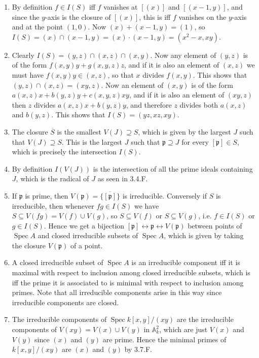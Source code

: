 \documentclass{report}
\newcommand{\closure}[1]{\overline{#1}} %
\newcommand{\p}{\mathfrak{p}}
\newcommand{\A}{\mathbb{A}}
\DeclareMathOperator{\Spec}{Spec}
\begin{document}
\begin{enumerate}[label=\textbf{3.7.\Alph*.}]
	\item By definition $f\in I(S)$ iff $f$ vanishes at $[(x)]$ and $[(x-1,y)]$,
	      and since the $y$-axis is the closure of $[(x)]$, this is iff $f$
	      vanishes on the $y$-axis and at the point $(1,0)$. Now $(x)+(x-1,y)=(1)$,
	      so $I(S)=(x)\cap(x-1,y)=(x)\cdot(x-1,y)=(x^2-x,xy)$.

	\item Clearly $I(S)=(y,z)\cap(x,z)\cap(x,y)$. Now any element of $(y,z)$ is
	      of the form $f(x,y)y+g(x,y,z)z$, and if it is also an element of $(x,z)$
	      we must have $f(x,y)y\in(x,z)$, so that $x$ divides $f(x,y)$. This shows
	      that $(y,z)\cap(x,z)=(xy,z)$. Now an element of $(x,y)$ is of the form
	      $a(x,z)x + b(y,z)y + c(x,y,z)xy$, and if it is also an element of
	      $(xy,z)$ then $z$ divides $a(x,z)x+b(y,z)y$, and therefore $z$ divides
	      both $a(x,z)$ and $b(y,z)$. This shows that $I(S)=(yz,xz,xy)$.

	\item The closure $\closure S$ is the smallest $V(J)\supseteq S$, which is
	      given by the largest $J$ such that $V(J)\supseteq S$. This is the
	      largest $J$ such that $\p\supseteq J$ for every $[\p]\in S$, which is
	      precisely the intersection $I(S)$.

	\item By definition $I(V(J))$ is the intersection of all the prime ideals
	      containing $J$, which is the radical of $J$ as seen in 3.4.F.

	\item If $\p$ is prime, then $V(\p)=\closure{\{[\p]\}}$ is irreducible.
	      Conversely if $S$ is irreducible, then whenever $fg\in I(S)$ we have
	      $S\subseteq V(fg)=V(f)\cup V(g)$, so
	      $S\subseteq V(f)$ or $S\subseteq V(g)$, i.e. $f\in I(S)$ or $g\in I(S)$.
	      Hence we get a bijection $[\p]\leftrightarrow\p\leftrightarrow V(\p)$
	      between points of $\Spec A$ and closed irreducible subsets of $\Spec A$,
	      which is given by taking the closure $V(\p)$ of a point.

	\item A closed irreducible subset of $\Spec A$ is an irreducible component
	      iff it is maximal with respect to inclusion among closed irreducible
	      subsets, which is iff the prime it is associated to is minimal with
	      respect to inclusion among primes. Note that all irreducible components
	      arise in this way since irreducible components are closed.

	\item The irreducible components of $\Spec k[x,y]/(xy)$ are the irreducible
	      components of $V(xy)=V(x)\cup V(y)$ in $\A^2_k$, which are just $V(x)$
	      and $V(y)$ since $(x)$ and $(y)$ are prime. Hence the minimal primes
	      of $k[x,y]/(xy)$ are $(x)$ and $(y)$ by 3.7.F.
\end{enumerate}
\end{document}

